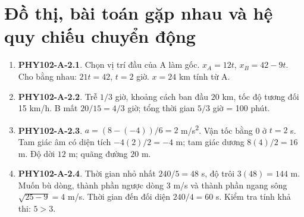 \documentclass[11pt,a4paper,openany]{book}
\begin{document}
\section{Đồ thị, bài toán gặp nhau và hệ quy chiếu chuyển động}
\begin{enumerate}
\item \textbf{PHY102-A-2.1}. Chọn vị trí đầu của A làm gốc. $x_A=12t$, $x_B=42-9t$. Cho bằng nhau: $21t=42$, $t=2$ giờ. $x=24$ km tính từ A.
\item \textbf{PHY102-A-2.2}. Trễ $1/3$ giờ, khoảng cách ban đầu $20$ km, tốc độ tương đối 15 km/h. B mất $20/15=4/3$ giờ; tổng thời gian $5/3$ giờ = 100 phút.
\item \textbf{PHY102-A-2.3}. $a=(8-(-4))/6=2$ m/s\textsuperscript{2}. Vận tốc bằng 0 ở $t=2$ s. Tam giác âm có diện tích $-4(2)/2=-4$ m; tam giác dương $8(4)/2=16$ m. Độ dời $12$ m; quãng đường $20$ m.
\item \textbf{PHY102-A-2.4}. Thời gian nhỏ nhất $240/5=48$ s, độ trôi $3(48)=144$ m. Muốn bù dòng, thành phần ngược dòng 3 m/s và thành phần ngang sông $\sqrt{25-9}=4$ m/s. Thời gian đến đối diện $240/4=60$ s. Kiểm tra tính khả thi: $5>3$.
\end{enumerate}
\end{document}
